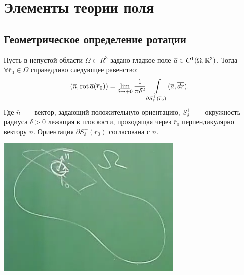 \section{Элементы теории поля}
\subsection{Геометрическое определение ротации}
\noindent 
    \begin{minipage}{0.65\textwidth}
   \begin{theorem}
    Пусть в непустой области $\Omega \subset R^3$ задано гладкое поле $\overline{a} \in C^1 (\Omega, \mathbb{R}^3)$. Тогда $\forall \overline{r}_0 \in \Omega$ справедливо следующее равенство: \[ (\overline{n}, \operatorname{rot} \overline{a}(\overline{r}_0)) = \lim\limits_{\delta \rightarrow +0} \dfrac{1}{\pi \delta^2} \int\limits_{\partial S^+_\delta(\overline{r}_0)} (\overline{a}, \overline{dr}).\]
    Где $\overline{n}$~---~вектор, задающий положительную ориентацию, $S^+_\delta$~---~окружность радиуса $\delta > 0$ лежащая в плоскости, проходящая через $\overline{r}_0$ перпендикулярно вектору $\overline{n}$. Ориентация $\partial S^+_\delta(\overline{r}_0)$ согласована с $\overline{n}$.
\end{theorem}
       
    \end{minipage}
    \begin{minipage}{0.35\textwidth}
    \includegraphics[width=\textwidth]{images/rotor777.png}
    \end{minipage}



